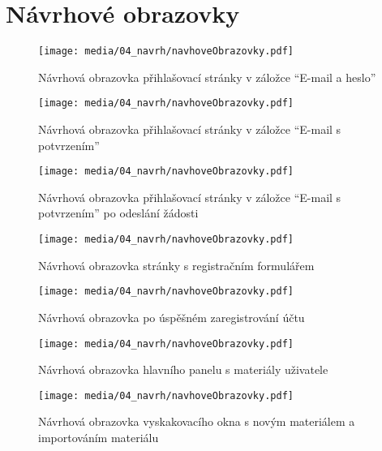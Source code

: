 \chapter{Návrhové obrazovky}\label{appendix:navrhoveObrazovky}



\begin{figure}[ht!]
    \centering
    \texttt{[image: media/04\_navrh/navhoveObrazovky.pdf]}
    \caption{Návrhová obrazovka přihlašovací stránky v záložce \enquote{E-mail a heslo}}
\end{figure}

\begin{figure}[ht!]
    \centering
    \texttt{[image: media/04\_navrh/navhoveObrazovky.pdf]}
    \caption{Návrhová obrazovka přihlašovací stránky v záložce \enquote{E-mail s potvrzením}}
\end{figure}

\begin{figure}[ht!]
    \centering
    \texttt{[image: media/04\_navrh/navhoveObrazovky.pdf]}
    \caption{Návrhová obrazovka přihlašovací stránky v záložce \enquote{E-mail s potvrzením} po odeslání žádosti}
\end{figure}



\begin{figure}[ht!]
    \centering
    \texttt{[image: media/04\_navrh/navhoveObrazovky.pdf]}
    \caption{Návrhová obrazovka stránky s registračním formulářem}
\end{figure}

\begin{figure}[ht!]
    \centering
    \texttt{[image: media/04\_navrh/navhoveObrazovky.pdf]}
    \caption{Návrhová obrazovka po úspěšném zaregistrování účtu}
\end{figure}

\begin{figure}[ht!]
    \centering
    \texttt{[image: media/04\_navrh/navhoveObrazovky.pdf]}
    \caption{Návrhová obrazovka hlavního panelu s materiály uživatele}
\end{figure}

\begin{figure}[ht!]
    \centering
    \texttt{[image: media/04\_navrh/navhoveObrazovky.pdf]}
    \caption{Návrhová obrazovka vyskakovacího okna s novým materiálem a importováním materiálu}
\end{figure}

